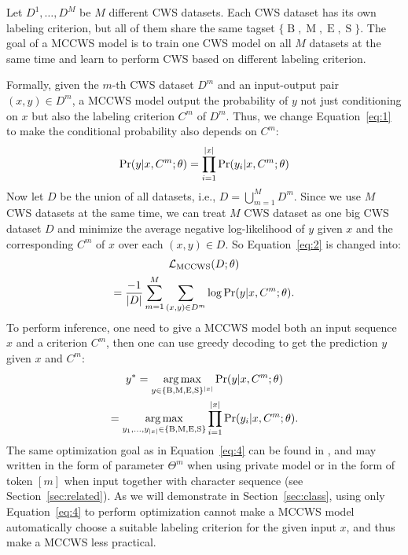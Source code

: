 \documentclass[11pt]{article}
\newcommand{\set}[1]{\lbrace #1 \rbrace}
\newcommand{\loss}{\mathcal{L}}
\newcommand{\BTag}{\operatorname{B}}
\newcommand{\MTag}{\operatorname{M}}
\newcommand{\ETag}{\operatorname{E}}
\newcommand{\STag}{\operatorname{S}}
\newcommand{\TagSet}{\set{\BTag, \MTag, \ETag, \STag}}
\newcommand{\opMCCWS}{\operatorname{MCCWS}}
\DeclareMathOperator*{\argmax}{\arg\max}
\DeclarePairedDelimiter{\abs}{\lvert}{\rvert}
\begin{document}
Let \(D^1, \dots, D^M\) be \(M\) different CWS datasets.
Each CWS dataset has its own labeling criterion, but all of them share the same tagset \(\TagSet\).
The goal of a MCCWS model is to train one CWS model on all \(M\) datasets at the same time and learn to perform CWS based on different labeling criterion.

Formally, given the \(m\)-th CWS dataset \(D^m\) and an input-output pair \((x, y) \in D^m\), a MCCWS model output the probability of \(y\) not just conditioning on \(x\) but also the labeling criterion \(C^m\) of \(D^m\).
Thus, we change Equation~\eqref{eq:1} to make the conditional probability also depends on \(C^m\):
\begin{equation}\label{eq:3}
  \Pr(y | x, C^m ; \theta) = \prod_{i = 1}^{\abs{x}} \Pr(y_i | x, C^m ; \theta)
\end{equation}
Now let \(D\) be the union of all datasets, i.e., \(D = \bigcup_{m = 1}^M D^m\).
Since we use \(M\) CWS datasets at the same time, we can treat \(M\) CWS dataset as one big CWS dataset \(D\) and minimize the average negative log-likelihood of \(y\) given \(x\) and the corresponding \(C^m\) of \(x\) over each \((x, y) \in D\).
So Equation~\eqref{eq:2} is changed into:
\begin{multline}\label{eq:4}
  \loss_{\opMCCWS}(D ; \theta) \\
  = \dfrac{-1}{\abs{D}} \sum_{m = 1}^M \sum_{(x, y) \in D^m} \log \Pr(y|x, C^m ; \theta).
\end{multline}
To perform inference, one need to give a MCCWS model both an input sequence \(x\) and a criterion \(C^m\), then one can use greedy decoding to get the prediction \(y\) given \(x\) and \(C^m\):
\begin{multline}\label{eq:5}
  y^* = \argmax_{y \in \TagSet^{\abs{x}}} \Pr(y | x, C^m ; \theta) \\
  = \argmax_{y_1, \dots, y_{\abs{x}} \in \TagSet} \prod_{i = 1}^{\abs{x}} \Pr(y_i | x, C^m ; \theta).
\end{multline}
The same optimization goal as in Equation~\eqref{eq:4} can be found in \cite{chen-etal-2017-adversarial,He-2019-effective,Gong-2019-switch,huang-etal-2020-towards,huang-etal-2020-joint-multiple,ke2020unified,qiu-etal-2020-concise,ke-etal-2021-pre}, and may written in the form of parameter \(\Theta^m\) when using private model or in the form of token \([m]\) when input together with character sequence (see Section~\ref{sec:related}).
As we will demonstrate in Section~\ref{sec:class}, using only Equation~\eqref{eq:4} to perform optimization cannot make a MCCWS model automatically choose a suitable labeling criterion for the given input \(x\), and thus make a MCCWS less practical.
\end{document}
